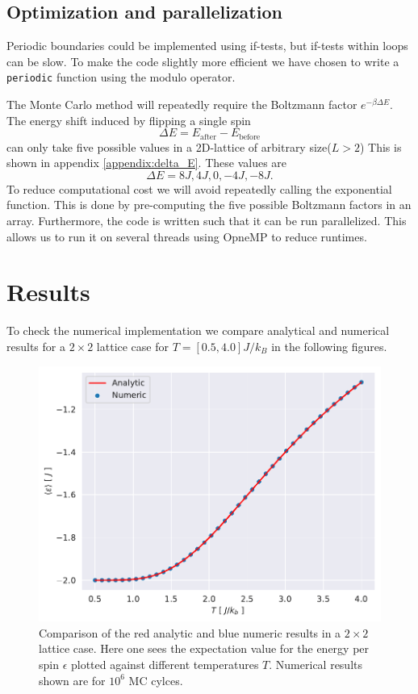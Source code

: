 \documentclass[english,notitlepage,reprint,nofootinbib]{revtex4-1}  %
\begin{document}
\subsection*{Optimization and parallelization}
Periodic boundaries could be implemented using if-tests, but if-tests within loops can be slow. To make the code slightly more efficient we have chosen to write a \texttt{periodic} function using the modulo operator.

The Monte Carlo method will repeatedly require the Boltzmann factor $e^{-\beta \Delta E}$. The energy shift induced by flipping a single spin 
\begin{equation}
    \Delta E = E_{\text{after}} - E_{\text{before}}
\end{equation}
can only take five possible values in a 2D-lattice of arbitrary size($L > 2$) This is shown in appendix \ref{appendix:delta_E}. These values are
\begin{equation}
    \Delta E = 8J, 4J, 0, -4J, -8J.
\end{equation}
To reduce computational cost we will avoid repeatedly calling the exponential function. This is done by pre-computing the five possible Boltzmann factors in an array.
Furthermore, the code is written such that it can be run parallelized. This allows us to run it on several threads using OpneMP to reduce runtimes.

\section{Results}\label{sec:results}
To check the numerical implementation we compare analytical and numerical results for a $2\times2$ lattice case for $T=[0.5,4.0]J/k_B$ in the following figures.

\begin{figure}[H]
    \centering
    \includegraphics[width=.5\textwidth]{../figures/numeric_analytic_e_T.pdf}
    \caption{Comparison of the red analytic and blue numeric results in a $2\times2$ lattice case. Here one sees the expectation value for the energy per spin $\epsilon$ plotted against different temperatures $T$. Numerical results shown are for $10^6$ MC cylces.}
    \label{fig:numeric_analytic_e_T}
\end{figure}
\end{document}
